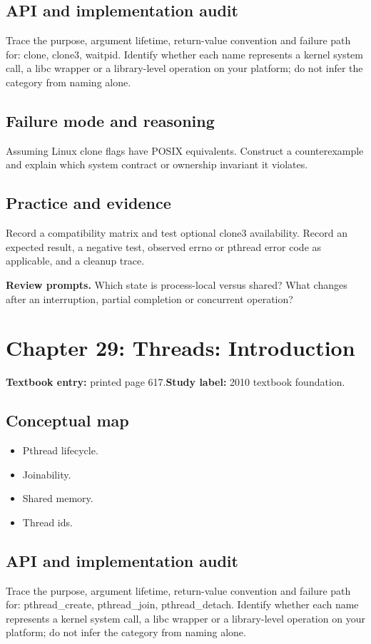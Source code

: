 \documentclass[11pt,letterpaper,oneside]{report}
\begin{document}
\subsection{API and implementation audit}
Trace the purpose, argument lifetime, return-value convention and failure path for: clone, clone3, waitpid. Identify whether each name represents a kernel system call, a libc wrapper or a library-level operation on your platform; do not infer the category from naming alone.

\subsection{Failure mode and reasoning}
Assuming Linux clone flags have POSIX equivalents. Construct a counterexample and explain which system contract or ownership invariant it violates.

\subsection{Practice and evidence}
Record a compatibility matrix and test optional clone3 availability. Record an expected result, a negative test, observed errno or pthread error code as applicable, and a cleanup trace.

\textbf{Review prompts.} Which state is process-local versus shared? What changes after an interruption, partial completion or concurrent operation?

\section{Chapter 29: Threads: Introduction}
\textbf{Textbook entry:} printed page 617.\quad \textbf{Study label:} 2010 textbook foundation.

\subsection{Conceptual map}
\begin{itemize}
\item Pthread lifecycle.
\item Joinability.
\item Shared memory.
\item Thread ids.
\end{itemize}
\subsection{API and implementation audit}
Trace the purpose, argument lifetime, return-value convention and failure path for: pthread\_create, pthread\_join, pthread\_detach. Identify whether each name represents a kernel system call, a libc wrapper or a library-level operation on your platform; do not infer the category from naming alone.
\end{document}
